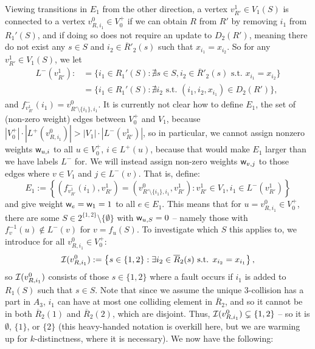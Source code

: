 \documentclass{theoretics}
\renewcommand{\>}{\rangle}
\newcommand{\<}{\langle}
\renewcommand{\(}{\left(}
\renewcommand{\)}{\right)}
\def\w{{\sf w}}
\begin{document}
Viewing transitions in $E_1$ from the other direction, a vertex $v^1_{R'} \in V_1(S)$ is connected to a vertex $v_{R,i_1}^0\in V_0^+$ if we can obtain $R$ from $R'$ by removing $i_1$ from $R_1'(S)$, and if doing so does not require an update to $D_2(R')$, meaning there do not exist any $s \in S$ and $i_2\in \overline{R}'_2(s)$ such that $x_{i_1}=x_{i_2}$. So for any $v^1_{R'}\in V_1(S)$, we let
\begin{equation}
\begin{split}
	L^-(v_{R'}^1):&=\{i_1 \in R_1'(S): \nexists s \in S, i_2\in \overline{R}'_2(s)\mbox{ s.t. }x_{i_1}=x_{i_2} \} \\
	&=\{i_1\in R_1'(S):\nexists i_2\mbox{ s.t. }(i_1,i_2,x_{i_1})\in D_2(R')\},
\end{split}\label{eq:3-dist-L-minus-1}
\end{equation}
and $f^-_{v_{R'}^1}(i_1) = v^0_{R'\setminus \{i_1\},i_1}$. It is currently not clear how to define $E_1$, the set of (non-zero weight) edges between $V_0^+$ and $V_1$, because $|V_0^+|\cdot |L^+(v_{R,i_1}^0)| > |V_1|\cdot |L^-(v_{R'}^1)|$, so in particular, we cannot assign nonzero weights $\w_{u,i}$ to all $u\in V_0^+$, $i\in L^+(u)$, because that would make $E_1$ larger than we have labels $L^-$ for. We will instead assign non-zero weights $\w_{v,j}$ to those edges where $v \in V_1$ and $j\in L^-(v)$. That is, define:
$$E_1 := \left\{\left(f^-_{v_{R'}^1}(i_1),v^1_{R'}\right)= \left(v^0_{R'\setminus \{i_1\},i_1},v^1_{R'}\right): v^1_{R'} \in V_1, i_1 \in L^-(v_{R'}^1)\right\}$$
and give weight $\w_e = \w_1 = 1$ to all $e \in E_1$. This means that for $u=v_{R,i_1}^0\in V_0^+$, there are some $S\in 2^{\{1,2\}}\setminus\{\emptyset\}$ with $\w_{u,S}=0$ -- namely those with $f_v^{-1}(u)\not\in L^-(v)$ for $v=f_u(S)$. To investigate which $S$ this applies to, we introduce for all $v_{R,i_1}^0\in V_0^+$:
\begin{equation}
{\cal I}(v^{0}_{R,i_1}):=\left\{s\in \{1,2\}: \exists i_{2}\in \overline{R}_{2}(s)\mbox{ s.t. }x_{i_2}=x_{i_1}\right\},\label{eq:3-dist-cal-I}
\end{equation}
so ${\cal I}(v^{0}_{R,i_1})$ consists of those $s \in \{1,2\}$ where a fault occurs if $i_1$ is added to $R_1(S)$ such that $s\in S$. Note that since we assume the unique 3-collision has a part in $A_3$, $i_1$ can have at most one colliding element in $\overline{R}_2$, and so it cannot be in both $\overline{R}_2(1)$ and $\overline{R}_2(2)$, which are disjoint. Thus, ${\cal I}(v^{0}_{R,i_1}) \subsetneq \{1,2\}$ -- so it is $\emptyset$, $\{1\}$, or $\{2\}$ (this heavy-handed notation is overkill here, but we are warming up for $k$-distinctness, where it is necessary). We now have the following:
\end{document}
